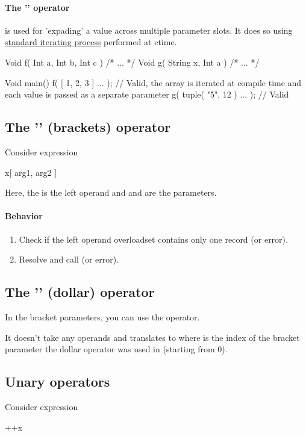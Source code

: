 \paragraph{The '' operator} is used for 'expading' a value across multiple parameter slots. It does so using \hyperref[iterators]{standard iterating process} performed at ctime.
\begin{code}
Void f( Int a, Int b, Int c ) { /* ... */ }
Void g( String x, Int a ) { /* ... */ }

Void main() {
	f( [ 1, 2, 3 ] ... ); // Valid, the array is iterated at compile time and each value is passed as a separate parameter
	g( tuple( "5", 12 ) ... ); // Valid
}
\end{code}

\subsection{The '' (brackets) operator}
Consider expression
\begin{code}
	x[ arg1, arg2 ]
\end{code}

Here, the  is the left operand and  and  are the parameters.

\paragraph{Behavior}
\begin{enumerate}
	\item Check if the left operand overloadset contains only one record (or error).
	\item Resolve and call  (or error).
\end{enumerate}

\subsection{The '\inlineCode{\$}' (dollar) operator}
In the bracket parameters, you can use the \inlineCode{\$} operator.

It doesn't take any operands and translates to  where  is the index of the bracket parameter the dollar operator was used in (starting from 0).

\subsection{Unary operators}
Consider expression
\begin{code}
	++x
\end{code}

